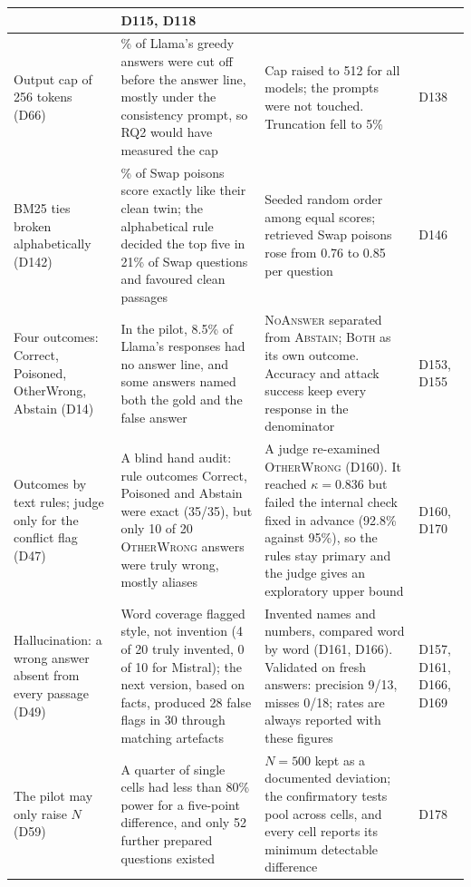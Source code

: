 \documentclass[11pt,a4paper]{report}
\begin{document}
{\begin{longtable}{
  >{\raggedright\arraybackslash}p{3.3cm}
  >{\raggedright\arraybackslash}p{4.9cm}
  >{\raggedright\arraybackslash}p{4.9cm}
  >{\raggedright\arraybackslash}p{1.6cm}}
  & D115, D118 \\
\midrule
Output cap of 256 tokens (D66)
  & 17\% of Llama's greedy answers were cut off before the answer line, mostly
    under the consistency prompt, so RQ2 would have measured the cap
  & Cap raised to 512 for all models; the prompts were not touched.
    Truncation fell to 5\%
  & D138 \\
\midrule
BM25 ties broken alphabetically (D142)
  & 62\% of Swap poisons score exactly like their clean twin; the
    alphabetical rule decided the top five in 21\% of Swap questions and
    favoured clean passages
  & Seeded random order among equal scores; retrieved Swap poisons rose from
    0.76 to 0.85 per question
  & D146 \\
\midrule
Four outcomes: Correct, Poisoned, OtherWrong, Abstain (D14)
  & In the pilot, 8.5\% of Llama's responses had no answer line, and some
    answers named both the gold and the false answer
  & \textsc{NoAnswer} separated from \textsc{Abstain}; \textsc{Both} as its
    own outcome. Accuracy and attack success keep every response in the
    denominator
  & D153, D155 \\
\midrule
Outcomes by text rules; judge only for the conflict flag (D47)
  & A blind hand audit: rule outcomes Correct, Poisoned and Abstain were
    exact (35/35), but only 10 of 20 \textsc{OtherWrong} answers were truly
    wrong, mostly aliases
  & A judge re-examined \textsc{OtherWrong} (D160). It reached
    $\kappa = 0.836$ but failed the internal check fixed in advance (92.8\%
    against 95\%), so the rules stay primary and the judge gives an
    exploratory upper bound
  & D160, D170 \\
\midrule
Hallucination: a wrong answer absent from every passage (D49)
  & Word coverage flagged style, not invention (4 of 20 truly invented, 0
    of 10 for Mistral); the next version, based on facts, produced 28 false
    flags in 30 through matching artefacts
  & Invented names and numbers, compared word by word (D161, D166).
    Validated on fresh answers: precision 9/13, misses 0/18; rates are
    always reported with these figures
  & D157, D161, D166, D169 \\
\midrule
The pilot may only raise $N$ (D59)
  & A quarter of single cells had less than 80\% power for a five-point
    difference, and only 52 further prepared questions existed
  & $N = 500$ kept as a documented deviation; the confirmatory tests pool
    across cells, and every cell reports its minimum detectable difference
  & D178 \\
\end{longtable}
}
\end{document}
